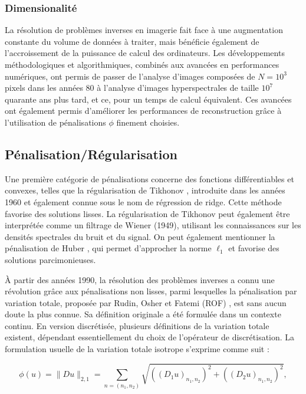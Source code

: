 \documentclass[a4paper, 12pt]{report} %
\begin{document}
\subsubsection{Dimensionalité}
La résolution de problèmes inverses en imagerie fait face à une augmentation constante du volume de données à traiter, mais bénéficie également de l’accroissement de la puissance de calcul des ordinateurs. Les développements méthodologiques et algorithmiques, combinés aux avancées en performances numériques, ont permis de passer de l’analyse d’images composées de \( N = 10^3 \) pixels dans les années 80 \cite{geman1984stochastic} à l’analyse d’images hyperspectrales de taille \( 10^7 \) \cite{guilloteau2020hyperspectral} quarante ans plus tard, et ce, pour un temps de calcul équivalent. Ces avancées ont également permis d’améliorer les performances de reconstruction grâce à l’utilisation de pénalisations \( \phi \) finement choisies.

\subsection{Pénalisation/Régularisation}
Une première catégorie de pénalisations concerne des fonctions différentiables et convexes, telles que la régularisation de Tikhonov \cite{tikhonov1963solution}, introduite dans les années 1960 et également connue sous le nom de régression de ridge. Cette méthode favorise des solutions lisses. La régularisation de Tikhonov peut également être interprétée comme un filtrage de Wiener (1949), utilisant les connaissances sur les densités spectrales du bruit et du signal. On peut également mentionner la pénalisation de Huber \cite{huber1992robust}, qui permet d'approcher la norme \(\ell_1\) et favorise des solutions parcimonieuses.

À partir des années 1990, la résolution des problèmes inverses a connu une révolution grâce aux pénalisations non lisses, parmi lesquelles la pénalisation par variation totale, proposée par Rudin, Osher et Fatemi (ROF) \cite{rudin1992nonlinear}, est sans aucun doute la plus connue. Sa définition originale a été formulée dans un contexte continu. En version discrétisée, plusieurs définitions de la variation totale existent, dépendant essentiellement du choix de l’opérateur de discrétisation. La formulation usuelle de la variation totale isotrope s'exprime comme suit :

\[
\phi(u) = \|Du\|_{2,1}  = \sum_{n=(n_1,n_2)} \sqrt{((D_1 u)_{n_1,n_2})^2 + ((D_2 u)_{n_1,n_2})^2},
\] 
\end{document}
